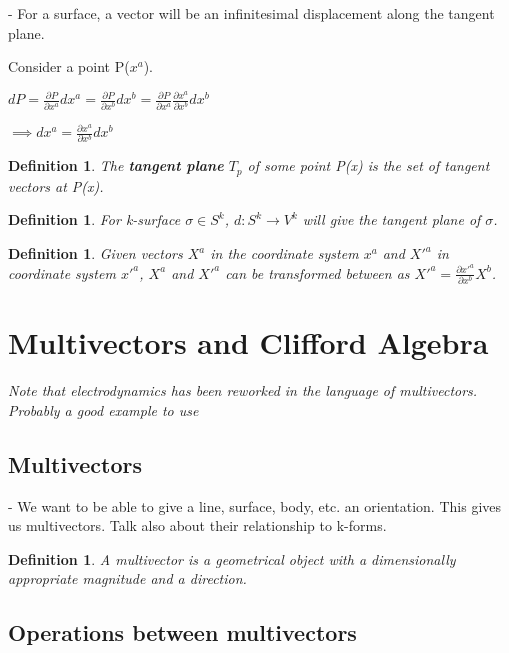 \documentclass{book}
\newtheorem{defn}[equation]{Definition}
\begin{document}
- For a surface, a vector will be an infinitesimal displacement along the tangent plane. 


Consider a point P($x^a$).
 
$dP = \frac{\partial P}{\partial x^a} dx^a = \frac{\partial P}{\partial x^b} dx^b = \frac{\partial P}{\partial x^a}\frac{\partial x^a}{\partial x^b} dx^b$

$\implies dx^a = \frac{\partial x^a}{\partial x^b}dx^b $


\begin{defn}
	The \textbf{tangent plane} $T_p$ of some point P(x) is the set of tangent vectors at P(x). 
\end{defn}
 
\begin{defn}
	For k-surface $\sigma \in S^k$, $d : S^k \to V^k$ will give the tangent plane of $\sigma$. 
\end{defn}

\begin{defn}
	Given vectors $X^a$ in the coordinate system $x^a$ and $X'^a$ in coordinate system $x'^a$, $X^a$ and $X'^a$ can be transformed between as $X'^a = \frac{\partial x'^a}{\partial x^b} X^b$. 
\end{defn}



\section{Multivectors and Clifford Algebra}

\emph{Note that electrodynamics has been reworked in the language of multivectors. Probably a good example to use}




\subsection{Multivectors}

- We want to be able to give a line, surface, body, etc. an orientation. This gives us multivectors. Talk also about their relationship to k-forms. 

\begin{defn}
	A multivector is a geometrical object with a dimensionally appropriate magnitude and a direction. 
\end{defn}



\subsection{Operations between multivectors}
\end{document}
